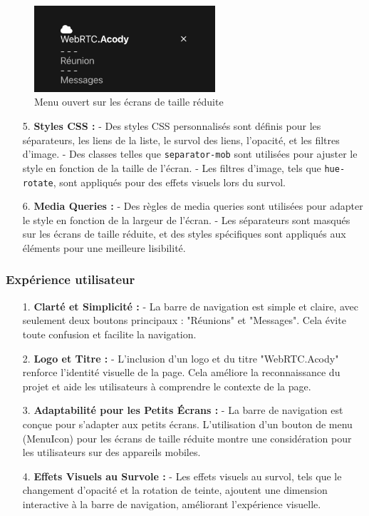 \documentclass[12pt, a4paper, oneside]{thesis}
\begin{document}
\begin{figure}[h]
    \centering
    \includegraphics[width=0.6\textwidth]{images/NavBarMobileOpen.png}
    \caption{Menu ouvert sur les écrans de taille réduite}
\end{figure}

\begin{enumerate}
    \item[5.] \textbf{Styles CSS :}
    - Des styles CSS personnalisés sont définis pour les séparateurs, les liens de la liste, le survol des liens, l'opacité, et les filtres d'image.
    - Des classes telles que \texttt{separator-mob} sont utilisées pour ajuster le style en fonction de la taille de l'écran.
    - Les filtres d'image, tels que \texttt{hue-rotate}, sont appliqués pour des effets visuels lors du survol.

    \item[6.] \textbf{Media Queries :}
    - Des règles de media queries sont utilisées pour adapter le style en fonction de la largeur de l'écran.
    - Les séparateurs sont masqués sur les écrans de taille réduite, et des styles spécifiques sont appliqués aux éléments pour une meilleure lisibilité.
\end{enumerate}

\subsubsection{Expérience utilisateur}
\begin{enumerate}
    \item[1.] \textbf{Clarté et Simplicité :}
    - La barre de navigation est simple et claire, avec seulement deux boutons principaux : "Réunions" et "Messages". Cela évite toute confusion et facilite la navigation.

    \item[2.] \textbf{Logo et Titre :}
    - L'inclusion d'un logo et du titre "WebRTC.Acody" renforce l'identité visuelle de la page. Cela améliore la reconnaissance du projet et aide les utilisateurs à comprendre le contexte de la page.
  
    \item[3.] \textbf{Adaptabilité pour les Petits Écrans :}
    - La barre de navigation est conçue pour s'adapter aux petits écrans. L'utilisation d'un bouton de menu (MenuIcon) pour les écrans de taille réduite montre une considération pour les utilisateurs sur des appareils mobiles.

    \item[4.] \textbf{Effets Visuels au Survole :}
    - Les effets visuels au survol, tels que le changement d'opacité et la rotation de teinte, ajoutent une dimension interactive à la barre de navigation, améliorant l'expérience visuelle.

\end{enumerate}
\end{document}

